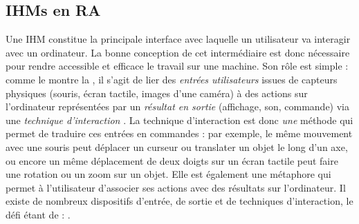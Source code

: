 \subsection{IHMs en RA}
\label{subsec:litterature_ar_hci_presentation}


Une IHM constitue la principale interface avec laquelle un utilisateur va interagir avec un ordinateur. La bonne conception de cet intermédiaire est donc nécessaire pour rendre accessible et efficace le travail sur une machine. Son rôle est simple : comme le montre la , il s'agit de lier des \emph{entrées utilisateurs} issues de capteurs physiques (souris, écran tactile, images d'une caméra) à des actions sur l'ordinateur représentées par un \emph{résultat en sortie} (affichage, son, commande) via une \emph{technique d'interaction} \citep{Billinghurst2005}. La technique d'interaction est donc \emph{une} méthode qui permet de traduire ces entrées en commandes : par exemple, le même mouvement avec une souris peut déplacer un curseur ou translater un objet le long d'un axe, ou encore un même déplacement de deux doigts sur un écran tactile peut faire une rotation ou un zoom sur un objet. Elle est également une métaphore qui permet à l'utilisateur d'associer ses actions avec des résultats sur l'ordinateur. Il existe de nombreux dispositifs d'entrée, de sortie et de techniques d'interaction, le défi étant de :  \citep{Billinghurst2005}.

